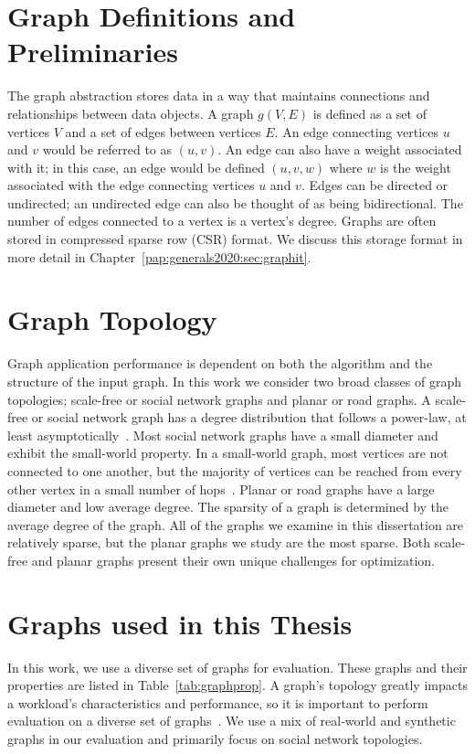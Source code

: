 \section{Graph Definitions and Preliminaries}\label{thesis:background:graphproc}
The graph abstraction stores data in a way that maintains connections and relationships between data objects.
A graph $g(V,E)$ is defined as a set of vertices $V$ and a set of edges between vertices $E$. 
An edge connecting vertices $u$ and $v$ would be referred to as $(u,v)$.
An edge can also have a weight associated with it; in this case, an edge would be defined $(u,v,w)$ where $w$ is the weight associated with the edge connecting vertices $u$ and $v$. 
Edges can be directed or undirected; an undirected edge can also be thought of as being bidirectional.
The number of edges connected to a vertex is a vertex's degree.
Graphs are often stored in compressed sparse row (CSR) format. 
We discuss this storage format in more detail in Chapter~\ref{pap:generals2020:sec:graphit}.

\section{Graph Topology}\label{thesis:background:topology}
Graph application performance is dependent on both the algorithm and the structure of the input graph.
In this work we consider two broad classes of graph topologies; scale-free or social network graphs and planar or road graphs.
A scale-free or social network graph has a degree distribution that follows a power-law, at least asymptotically~\cite{barabasi1999emergence}.
Most social network graphs have a small diameter and exhibit the small-world property. 
In a small-world graph, most vertices are not connected to one another, but the majority of vertices can be reached from every other vertex in a small number of hops~\cite{watts1998collective}.
Planar or road graphs have a large diameter and low average degree.
The sparsity of a graph is determined by the average degree of the graph.
All of the graphs we examine in this dissertation are relatively sparse, but the planar graphs we study are the most sparse.
Both scale-free and planar graphs present their own unique challenges for optimization.

\section{Graphs used in this Thesis}\label{thesis:background:graphs}
In this work, we use a diverse set of graphs for evaluation.
These graphs and their properties are listed in Table~\ref{tab:graphprop}.
A graph's topology greatly impacts a workload's characteristics and performance, so it is important to perform evaluation on a diverse set of graphs~\cite{beamer2015locality}.
We use a mix of real-world and synthetic graphs in our evaluation and primarily focus on social network topologies. 

